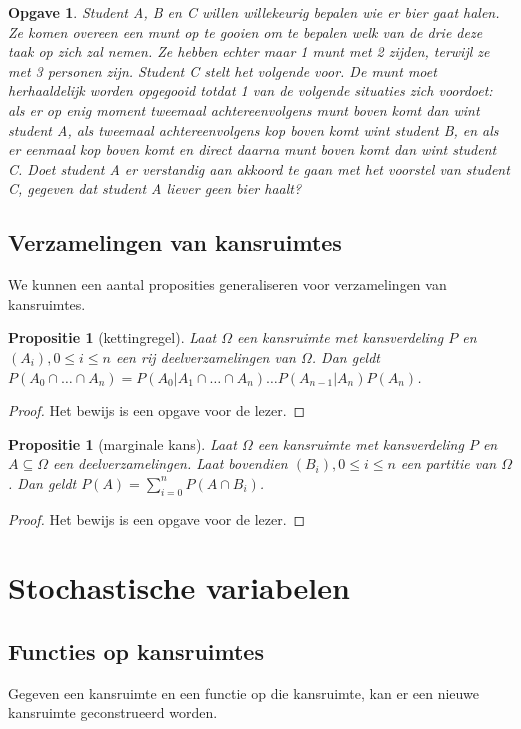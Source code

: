 \documentclass[a4paper]{book}
\newtheorem{proposition}[theorem]{Propositie}
\newtheorem{exercise}[theorem]{Opgave}
\theoremstyle{definition}
\begin{document}
\begin{exercise}
Student A, B en C willen willekeurig bepalen wie er bier gaat halen.
Ze komen overeen een munt op te gooien om te bepalen welk van de drie deze taak op zich zal nemen.
Ze hebben echter maar 1 munt met 2 zijden, terwijl ze met 3 personen zijn. Student C stelt het volgende voor. De munt moet herhaaldelijk worden opgegooid
totdat 1 van de volgende situaties zich voordoet: als er op enig moment tweemaal achtereenvolgens munt boven komt dan wint student A, als tweemaal
achtereenvolgens kop boven komt wint student B, en als er eenmaal kop boven komt en direct daarna munt boven komt dan wint student C. Doet student A er
verstandig aan akkoord te gaan met het voorstel van student C, gegeven dat student A liever geen bier haalt?
\end{exercise}


\section{Verzamelingen van kansruimtes}
We kunnen een aantal proposities generaliseren voor verzamelingen van kansruimtes.

\begin{proposition}[kettingregel]
    Laat $\Omega$ een kansruimte met kansverdeling $P$ en $(A_i), 0 \leq i \leq n$ een rij deelverzamelingen van $\Omega$.
    Dan geldt $P(A_0 \cap \dots \cap A_n) = P(A_0|A_1 \cap \dots \cap A_n) \dots P(A_{n-1}|A_n)P(A_n)$.
\end{proposition}
\begin{proof}
    Het bewijs is een opgave voor de lezer.
\end{proof}

\begin{proposition}[marginale kans]
    Laat $\Omega$ een kansruimte met kansverdeling $P$ en $A \subseteq \Omega$ een deelverzamelingen.
    Laat bovendien $(B_i), 0 \leq i \leq n$ een partitie van $\Omega$.
    Dan geldt $P(A) = \sum_{i=0}^n P(A \cap B_i)$.
\end{proposition}
\begin{proof}
    Het bewijs is een opgave voor de lezer.
\end{proof}




\chapter{Stochastische variabelen}


\section{Functies op kansruimtes}
Gegeven een kansruimte en een functie op die kansruimte, kan er een nieuwe kansruimte geconstrueerd worden.
\end{document}
